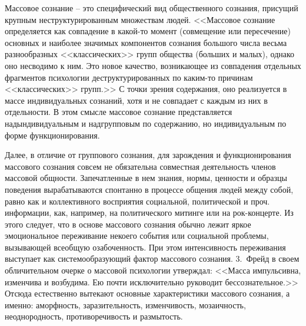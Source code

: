 Массовое сознание -- это специфический вид общественного сознания, присущий крупным
неструктурированным множествам людей. <<Массовое сознание определяется как совпадение в какой-то момент
(совмещение или пересечение) основных и наиболее значимых компонентов сознания большого числа весьма
разнообразных <<классических>> групп общества (больших и малых), однако оно несводимо к ним. Это новое качество,
возникающее из совпадения отдельных фрагментов психологии деструктурированных по каким-то причинам <<классических>>
групп.>>\autocite{book:olshansky} С точки зрения содержания, оно реализуется в массе индивидуальных сознаний,
хотя и не совпадает с каждым из них в отдельности. В этом смысле массовое сознание представляется надындивидуальным
и надгрупповым по содержанию, но индивидуальным по форме функционирования.

Далее, в отличие от группового сознания, для зарождения и функционирования массового сознания совсем не
обязательна совместная деятельность членов массовой общности. Запечатленные в нем знания, нормы, ценности и
образцы поведения вырабатываются спонтанно в процессе общения людей между собой, равно как и коллективного
восприятия социальной, политической и проч. информации, как, например, на политического митинге или на рок-концерте.
Из этого следует, что в основе массового сознания обычно лежит яркое эмоциональное переживание некоего
события или социальной проблемы, вызывающей всеобщую озабоченность. При этом интенсивность переживания
выступает как системообразующий фактор массового сознания. 3.~Фрейд в своем обличительном очерке о массовой
психологии утверждал: <<Масса импульсивна, изменчива и возбудима. Ею почти исключительно руководит
бессознательное.>>\autocite{freid_mass} Отсюда естественно вытекают основные характеристики массового сознания,
а именно: аморфность, заразительность, изменчивость, мозаичность, неоднородность, противоречивость и
размытость.\autocite{ashin}\autocite{flier}\autocite{prokudin}\autocite{heveshi}\autocite{hevishi2001tolpa}\autocite{streltsov1970}\autocite{dodonov1999}


